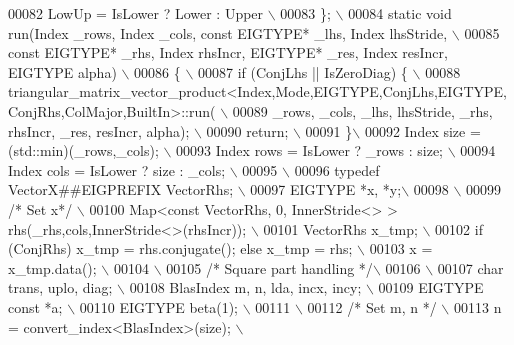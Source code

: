 \begin{DoxyCode}
00082 \textcolor{preprocessor}{    LowUp = IsLower ? Lower : Upper \(\backslash\)}
00083 \textcolor{preprocessor}{  \}; \(\backslash\)}
00084 \textcolor{preprocessor}{ static void run(Index \_rows, Index \_cols, const EIGTYPE* \_lhs, Index lhsStride, \(\backslash\)}
00085 \textcolor{preprocessor}{                 const EIGTYPE* \_rhs, Index rhsIncr, EIGTYPE* \_res, Index resIncr, EIGTYPE alpha) \(\backslash\)}
00086 \textcolor{preprocessor}{ \{ \(\backslash\)}
00087 \textcolor{preprocessor}{   if (ConjLhs || IsZeroDiag) \{ \(\backslash\)}
00088 \textcolor{preprocessor}{     triangular\_matrix\_vector\_product<Index,Mode,EIGTYPE,ConjLhs,EIGTYPE,ConjRhs,ColMajor,BuiltIn>::run( \(\backslash\)}
00089 \textcolor{preprocessor}{       \_rows, \_cols, \_lhs, lhsStride, \_rhs, rhsIncr, \_res, resIncr, alpha); \(\backslash\)}
00090 \textcolor{preprocessor}{     return; \(\backslash\)}
00091 \textcolor{preprocessor}{   \}\(\backslash\)}
00092 \textcolor{preprocessor}{   Index size = (std::min)(\_rows,\_cols); \(\backslash\)}
00093 \textcolor{preprocessor}{   Index rows = IsLower ? \_rows : size; \(\backslash\)}
00094 \textcolor{preprocessor}{   Index cols = IsLower ? size : \_cols; \(\backslash\)}
00095 \textcolor{preprocessor}{\(\backslash\)}
00096 \textcolor{preprocessor}{   typedef VectorX##EIGPREFIX VectorRhs; \(\backslash\)}
00097 \textcolor{preprocessor}{   EIGTYPE *x, *y;\(\backslash\)}
00098 \textcolor{preprocessor}{\(\backslash\)}
00099 \textcolor{preprocessor}{}\textcolor{comment}{/* Set x*/}\textcolor{preprocessor}{ \(\backslash\)}
00100 \textcolor{preprocessor}{   Map<const VectorRhs, 0, InnerStride<> > rhs(\_rhs,cols,InnerStride<>(rhsIncr)); \(\backslash\)}
00101 \textcolor{preprocessor}{   VectorRhs x\_tmp; \(\backslash\)}
00102 \textcolor{preprocessor}{   if (ConjRhs) x\_tmp = rhs.conjugate(); else x\_tmp = rhs; \(\backslash\)}
00103 \textcolor{preprocessor}{   x = x\_tmp.data(); \(\backslash\)}
00104 \textcolor{preprocessor}{\(\backslash\)}
00105 \textcolor{preprocessor}{}\textcolor{comment}{/* Square part handling */}\textcolor{preprocessor}{\(\backslash\)}
00106 \textcolor{preprocessor}{\(\backslash\)}
00107 \textcolor{preprocessor}{   char trans, uplo, diag; \(\backslash\)}
00108 \textcolor{preprocessor}{   BlasIndex m, n, lda, incx, incy; \(\backslash\)}
00109 \textcolor{preprocessor}{   EIGTYPE const *a; \(\backslash\)}
00110 \textcolor{preprocessor}{   EIGTYPE beta(1); \(\backslash\)}
00111 \textcolor{preprocessor}{\(\backslash\)}
00112 \textcolor{preprocessor}{}\textcolor{comment}{/* Set m, n */}\textcolor{preprocessor}{ \(\backslash\)}
00113 \textcolor{preprocessor}{   n = convert\_index<BlasIndex>(size); \(\backslash\)}

\end{DoxyCode}
